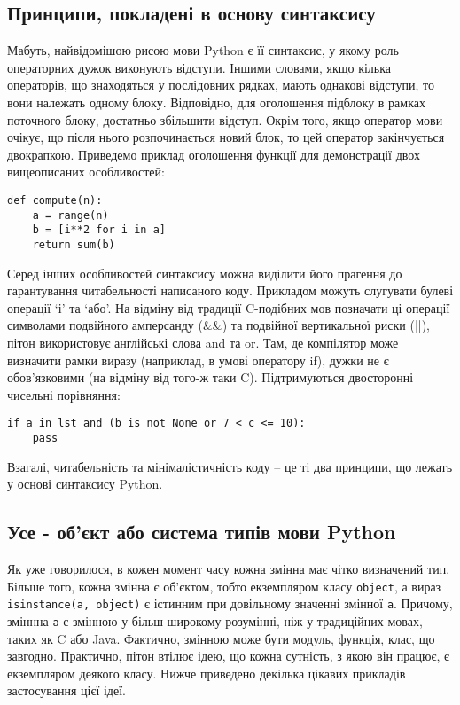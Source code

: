 \documentclass[a4paper, 12pt, onsedie]{article}
\begin{document}
\subsection{Принципи, покладені в основу синтаксису}
Мабуть, найвідомішою рисою мови Python є її синтаксис, у якому роль операторних дужок
виконують відступи. Іншими словами, якщо кілька операторів, що знаходяться у послідовних 
рядках, мають однакові відступи, то вони належать одному блоку. Відповідно, для оголошення
підблоку в рамках поточного блоку, достатньо збільшити відступ. Окрім того, якщо оператор
мови очікує, що після нього розпочинається новий блок, то цей оператор закінчується 
двокрапкою. Приведемо приклад оголошення функції для демонстрації двох вищеописаних
особливостей:

\begin{verbatim}
def compute(n):
    a = range(n)
    b = [i**2 for i in a]
    return sum(b)
\end{verbatim}

Серед інших особливостей синтаксису можна виділити його прагення до
гарантування читабельності написаного коду. Прикладом можуть слугувати булеві операції `і'
та `або'. На відміну від традиції C-подібних мов позначати ці операції символами подвійного
амперсанду (\&\&) та подвійної вертикальної риски (||), пітон використовує англійські слова
and та or. Там, де компілятор може визначити рамки виразу (наприклад, в умові оператору if),
дужки не є обов'язковими (на відміну від того-ж таки C). Підтримуються двосторонні чисельні
порівняння:

\begin{verbatim}
if a in lst and (b is not None or 7 < c <= 10):
    pass
\end{verbatim}

Взагалі, читабельність та
мінімалістичність коду -- це ті два принципи, що лежать у основі синтаксису Python.

\subsection{Усе - об'єкт або система типів мови Python}
Як уже говорилося, в кожен момент часу кожна змінна має чітко визначений тип. Більше того,
кожна змінна є об'єктом, тобто екземпляром класу \texttt{object}, а вираз 
\texttt{isinstance(a, object)} є істинним при довільному значенні змінної \texttt{a}. 
Причому, зміннна \texttt{a} є змінною у більш широкому розумінні, ніж у традиційних
мовах, таких як C або Java. Фактично, змінною може бути модуль, функція, клас,
що завгодно. Практично, пітон втілює ідею, що кожна сутність, з якою він працює, є 
екземпляром деякого класу. Нижче приведено декілька цікавих прикладів застосування
цієї ідеї.
\end{document}
